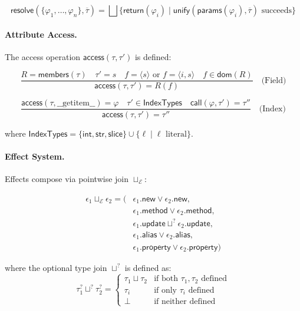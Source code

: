 \[
\mathsf{resolve}(\{\varphi_1, \ldots, \varphi_n\}, \overline{\tau}) = \bigsqcup\{\mathsf{return}(\varphi_i) \mid \mathsf{unify}(\mathsf{params}(\varphi_i), \overline{\tau}) \text{ succeeds}\}
\]

\paragraph{Attribute Access.} The access operation $\mathsf{access}(\tau, \tau')$ is defined:

\[
\frac{R = \mathsf{members}(\tau) \quad \tau' = s \quad f = \langle s \rangle \text{ or } f = \langle i, s \rangle \quad f \in \mathsf{dom}(R)}{\mathsf{access}(\tau, \tau') = R(f)} \quad \text{(Field)}
\]

\[
\frac{\mathsf{access}(\tau, \text{\_\_getitem\_\_}) = \varphi \quad \tau' \in \mathsf{IndexTypes} \quad \mathsf{call}(\varphi, \tau') = \tau''}{\mathsf{access}(\tau, \tau') = \tau''} \quad \text{(Index)}
\]

where $\mathsf{IndexTypes} = \{\mathsf{int}, \mathsf{str}, \mathsf{slice}\} \cup \{\ell \mid \ell \text{ literal}\}$.

\paragraph{Effect System.} Effects compose via pointwise join $\sqcup_\mathcal{E}$:

\[
\begin{aligned}
\epsilon_1 \sqcup_\mathcal{E} \epsilon_2 = (&\epsilon_1.\mathsf{new} \lor \epsilon_2.\mathsf{new}, \\
&\epsilon_1.\mathsf{method} \lor \epsilon_2.\mathsf{method}, \\
&\epsilon_1.\mathsf{update} \sqcup^? \epsilon_2.\mathsf{update}, \\
&\epsilon_1.\mathsf{alias} \lor \epsilon_2.\mathsf{alias}, \\
&\epsilon_1.\mathsf{property} \lor \epsilon_2.\mathsf{property})
\end{aligned}
\]

where the optional type join $\sqcup^?$ is defined as:
\[
\tau_1^? \sqcup^? \tau_2^? = \begin{cases}
\tau_1 \sqcup \tau_2 & \text{if both } \tau_1, \tau_2 \text{ defined} \\
\tau_i & \text{if only } \tau_i \text{ defined} \\
\bot & \text{if neither defined}
\end{cases}
\]

